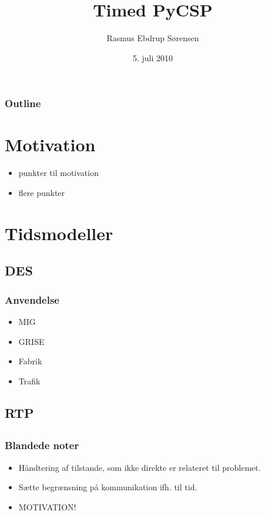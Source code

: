 \documentclass{beamer}
\title
{Timed PyCSP}
\author
{Rasmus Ebdrup Sørensen}
\date
{5. juli 2010}
\begin{document}
\begin{frame}
  \titlepage
\end{frame}

\begin{frame}
  \frametitle{Outline}
  \tableofcontents
\end{frame}

\section{Motivation}

\begin{frame}
  \begin{itemize}
    \item punkter til motivation
    \item flere punkter
  \end{itemize}
\end{frame}


\section{Tidsmodeller}

\subsection{DES}

\begin{frame}
  \frametitle{Anvendelse}
  \begin{itemize}
	\item MIG
	\item GRISE
	\item Fabrik
	\item Trafik
  \end{itemize}
\end{frame}

\subsection{RTP}



\subsection[Proactive]{}
\begin{frame}
  \frametitle{Blandede noter}
  \begin{itemize}
    \item Håndtering af tilstande, som ikke direkte er relateret til problemet.
    \item Sætte begrænsning på kommunikation ifh. til tid.
    \item MOTIVATION!
  \end{itemize}
\end{frame}
\end{document}
